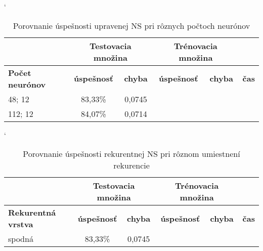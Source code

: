 \begin{table}[h]
\catcode` %
\centering
\begin{tabular}{|l|c|c|c|c|c|}
\cline{2-5}
\multicolumn{1}{l}{} & \multicolumn{2}{|c|}{\textbf{Testovacia množina}} & \multicolumn{2}{c|}{\textbf{Trénovacia množina}} & \multicolumn{1}{l}{}\\ 
\hline
\textbf{Počet neurónov} & \textbf{úspešnosť} & \textbf{chyba} & \textbf{úspešnosť} & \textbf{chyba} & \textbf{čas} \\ \hline
48; 12 & 83,33\% & 0,0745 & & &\\ \hline
112; 12 & 84,07\% & 0,0714 & & &\\
\hline
\end{tabular}
\caption{Porovnanie úspešnosti upravenej NS pri rôznych počtoch neurónov}
\label{tab:neuroncountcmp2}
\end{table}


\todo



\begin{table}[h]
\catcode` %
\centering
\begin{tabular}{|l|c|c|c|c|c|}
\cline{2-5}
\multicolumn{1}{l}{} & \multicolumn{2}{|c|}{\textbf{Testovacia množina}} & \multicolumn{2}{c|}{\textbf{Trénovacia množina}} & \multicolumn{1}{l}{}\\ 
\hline
\textbf{Rekurentná vrstva} & \textbf{úspešnosť} & \textbf{chyba} & \textbf{úspešnosť} & \textbf{chyba} & \textbf{čas} \\ \hline
spodná & 83,33\% & 0,0745 & & &\\ \hline
\end{tabular}
\caption{Porovnanie úspešnosti rekurentnej NS pri rôznom umiestnení rekurencie}
\label{tab:neuroncountcmp2}
\end{table}

